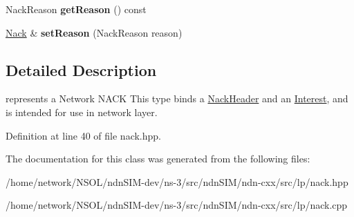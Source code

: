 \begin{DoxyCompactItemize}
\item 
Nack\+Reason {\bfseries get\+Reason} () const\hypertarget{classndn_1_1lp_1_1Nack_aa469bc8258251beb2f668d960426fd01}{}\label{classndn_1_1lp_1_1Nack_aa469bc8258251beb2f668d960426fd01}

\item 
\hyperlink{classndn_1_1lp_1_1Nack}{Nack} \& {\bfseries set\+Reason} (Nack\+Reason reason)\hypertarget{classndn_1_1lp_1_1Nack_a4e7fb1bca33e13a74f01e3a722342641}{}\label{classndn_1_1lp_1_1Nack_a4e7fb1bca33e13a74f01e3a722342641}

\end{DoxyCompactItemize}


\subsection{Detailed Description}
represents a Network N\+A\+CK  This type binds a \hyperlink{classndn_1_1lp_1_1NackHeader}{Nack\+Header} and an \hyperlink{classndn_1_1Interest}{Interest}, and is intended for use in network layer. 

Definition at line 40 of file nack.\+hpp.



The documentation for this class was generated from the following files\+:\begin{DoxyCompactItemize}
\item 
/home/network/\+N\+S\+O\+L/ndn\+S\+I\+M-\/dev/ns-\/3/src/ndn\+S\+I\+M/ndn-\/cxx/src/lp/nack.\+hpp\item 
/home/network/\+N\+S\+O\+L/ndn\+S\+I\+M-\/dev/ns-\/3/src/ndn\+S\+I\+M/ndn-\/cxx/src/lp/nack.\+cpp\end{DoxyCompactItemize}

